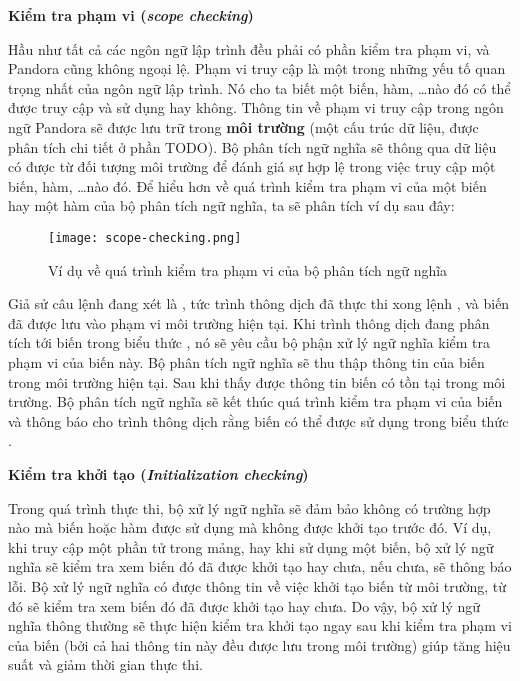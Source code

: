 \noindent \textbf{Kiểm tra phạm vi (\textit{scope checking})}

    Hầu như tất cả các ngôn ngữ lập trình đều phải có phần kiểm tra phạm vi, và Pandora cũng không ngoại lệ. Phạm vi truy cập là một trong những yếu tố quan trọng nhất của ngôn ngữ lập trình. Nó cho ta biết một biến, hàm, \dots nào đó có thể được truy cập và sử dụng hay không. Thông tin về phạm vi truy cập trong ngôn ngữ Pandora sẽ được lưu trữ trong \textbf{môi trường} (một cấu trúc dữ liệu, được phân tích chi tiết ở phần TODO). Bộ phân tích ngữ nghĩa sẽ thông qua dữ liệu có được từ đối tượng môi trường để đánh giá sự hợp lệ trong việc truy cập một biến, hàm, \dots nào đó. Để hiểu hơn về quá trình kiểm tra phạm vi của một biến hay một hàm của bộ phân tích ngữ nghĩa, ta sẽ phân tích ví dụ sau đây:   

\begin{figure}[H]
    \centering
    \texttt{[image: scope-checking.png]}
    \caption{Ví dụ về quá trình kiểm tra phạm vi của bộ phân tích ngữ nghĩa}
\end{figure}

    Giả sử câu lệnh đang xét là , tức trình thông dịch đã thực thi xong lệnh , và biến  đã được lưu vào phạm vi môi trường hiện tại. Khi trình thông dịch đang phân tích tới biến  trong biểu thức , nó sẽ yêu cầu bộ phận xử lý ngữ nghĩa kiểm tra phạm vi của biến này. Bộ phân tích ngữ nghĩa sẽ thu thập thông tin của biến  trong môi trường hiện tại. Sau khi thấy được thông tin biến  có tồn tại trong môi trường. Bộ phân tích ngữ nghĩa sẽ kết thúc quá trình kiểm tra phạm vi của biến  và thông báo cho trình thông dịch rằng biến  có thể được sử dụng trong biểu thức .

\noindent \textbf{Kiểm tra khởi tạo (\textit{Initialization checking})}

    Trong quá trình thực thi, bộ xử lý ngữ nghĩa sẽ đảm bảo không có trường hợp nào mà biến hoặc hàm được sử dụng mà không được khởi tạo trước đó. Ví dụ, khi truy cập một phần tử trong mảng, hay khi sử dụng một biến, bộ xử lý ngữ nghĩa sẽ kiểm tra xem biến đó đã được khởi tạo hay chưa, nếu chưa, sẽ thông báo lỗi. Bộ xử lý ngữ nghĩa có được thông tin về việc khởi tạo biến từ môi trường, từ đó sẽ kiểm tra xem biến đó đã được khởi tạo hay chưa. Do vậy, bộ xử lý ngữ nghĩa thông thường sẽ thực hiện kiểm tra khởi tạo ngay sau khi kiểm tra phạm vi của biến (bởi cả hai thông tin này đều được lưu trong môi trường) giúp tăng hiệu suất và giảm thời gian thực thi. 

